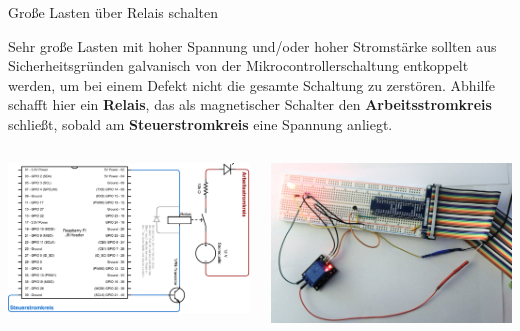 {
\footnotesize

\begin{frame}{Große Lasten über Relais schalten}
    \parbox{\linewidth}{
        Sehr große Lasten mit hoher Spannung und/oder hoher Stromstärke sollten aus
        Sicherheitsgründen galvanisch von der Mikrocontrollerschaltung entkoppelt werden, um
        bei einem Defekt nicht die gesamte Schaltung zu zerstören. Abhilfe schafft hier ein
        \textbf{Relais}, das als magnetischer Schalter den \textbf{Arbeitsstromkreis}
        schließt, sobald am \textbf{Steuerstromkreis} eine Spannung anliegt.
    }

    \bigskip

    \begin{columns}
        \includegraphics[width=\textwidth]{2-hardwaredesign/img/led_relais_schaltplan}

        \includegraphics[width=\textwidth]{2-hardwaredesign/img/led_relais_foto}
    \end{columns}
\end{frame}
}

